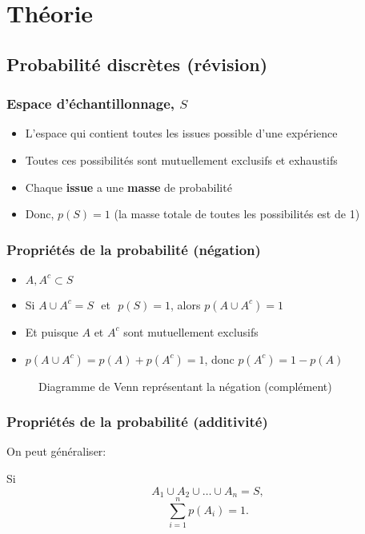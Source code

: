 \documentclass{beamer}
\begin{document}

\section{Théorie}


\subsection{Probabilité discrètes (révision)}

\begin{frame}
    \frametitle{Espace d'échantillonnage, $S$}
    \begin{itemize}
      \item L'espace qui contient toutes les issues possible d'une expérience
      \pause
      \item Toutes ces possibilités sont mutuellement exclusifs et exhaustifs
      \pause
      \item Chaque \textbf{issue} a une \textbf{masse} de probabilité
      \pause
      \item Donc, $p(S) = 1$ (la masse totale de toutes les possibilités est de 1)
    \end{itemize}
\end{frame}


\begin{frame}
    \frametitle{Propriétés de la probabilité (négation)}
    \begin{itemize}
      \item $A, A^c \subset S$
      \item Si $A \cup A^c = S \, \, $ et $ \, \, p(S) = 1$, alors $p(A \cup A^c) = 1$
      \pause
      \item Et puisque $A$ et $A^c$ sont mutuellement exclusifs
      \pause
      \item $p(A \cup A^c) = p(A) + p(A^c) = 1$, donc $p(A^c) = 1 - p(A)$
    \end{itemize}
    \pause
    \begin{figure}
      \centering
      \scalebox{1}{}
      \caption{Diagramme de Venn représentant la négation (complément)}
    \end{figure}
\end{frame}


\begin{frame}
    \frametitle{Propriétés de la probabilité (additivité)}
    On peut généraliser:

    \pause

    \vfill

    Si 
    \[A_1 \cup A_2 \cup \ldots \cup A_n = S,\]
    \[\sum_{i=1}^{n} p(A_i) = 1.\]
\end{frame}
\end{document}
